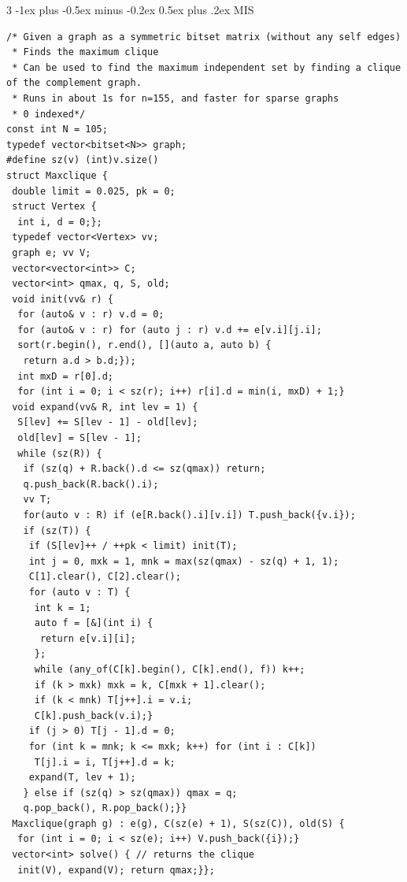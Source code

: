\documentclass[8pt,a4paper,onesided]{article}
\makeatletter
\renewcommand{\subsection}{\@startsection{subsection}{2}{0mm}
    {-1ex plus -0.5ex minus -0.2ex} %
    {0.5ex plus .2ex}                %
    {\normalfont\large\bfseries}}    %
\makeatother
\begin{document}
\begin{multicols}{3}
\subsection{MIS}
\begin{verbatim}
/* Given a graph as a symmetric bitset matrix (without any self edges)
 * Finds the maximum clique
 * Can be used to find the maximum independent set by finding a clique of the complement graph.
 * Runs in about 1s for n=155, and faster for sparse graphs
 * 0 indexed*/
const int N = 105;
typedef vector<bitset<N>> graph;
#define sz(v) (int)v.size()
struct Maxclique {
 double limit = 0.025, pk = 0;
 struct Vertex {
  int i, d = 0;};
 typedef vector<Vertex> vv;
 graph e; vv V;
 vector<vector<int>> C;
 vector<int> qmax, q, S, old;
 void init(vv& r) {
  for (auto& v : r) v.d = 0;
  for (auto& v : r) for (auto j : r) v.d += e[v.i][j.i];
  sort(r.begin(), r.end(), [](auto a, auto b) {
   return a.d > b.d;});
  int mxD = r[0].d;
  for (int i = 0; i < sz(r); i++) r[i].d = min(i, mxD) + 1;}
 void expand(vv& R, int lev = 1) {
  S[lev] += S[lev - 1] - old[lev];
  old[lev] = S[lev - 1];
  while (sz(R)) {
   if (sz(q) + R.back().d <= sz(qmax)) return;
   q.push_back(R.back().i);
   vv T;
   for(auto v : R) if (e[R.back().i][v.i]) T.push_back({v.i});
   if (sz(T)) {
    if (S[lev]++ / ++pk < limit) init(T);
    int j = 0, mxk = 1, mnk = max(sz(qmax) - sz(q) + 1, 1);
    C[1].clear(), C[2].clear();
    for (auto v : T) {
     int k = 1;
     auto f = [&](int i) {
      return e[v.i][i];
     };
     while (any_of(C[k].begin(), C[k].end(), f)) k++;
     if (k > mxk) mxk = k, C[mxk + 1].clear();
     if (k < mnk) T[j++].i = v.i;
     C[k].push_back(v.i);}
    if (j > 0) T[j - 1].d = 0;
    for (int k = mnk; k <= mxk; k++) for (int i : C[k])
     T[j].i = i, T[j++].d = k;
    expand(T, lev + 1);
   } else if (sz(q) > sz(qmax)) qmax = q;
   q.pop_back(), R.pop_back();}}
 Maxclique(graph g) : e(g), C(sz(e) + 1), S(sz(C)), old(S) {
  for (int i = 0; i < sz(e); i++) V.push_back({i});}
 vector<int> solve() { // returns the clique
  init(V), expand(V); return qmax;}};
\end{verbatim}

\end{multicols}
\end{document}
